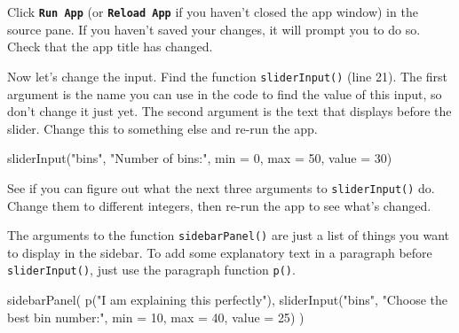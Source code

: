 \documentclass[
  oneside]{book}
\newenvironment{Shaded}{\begin{snugshade}}{\end{snugshade}}
\newcommand{\AttributeTok}[1]{\textcolor[rgb]{0.77,0.63,0.00}{#1}}
\newcommand{\DecValTok}[1]{\textcolor[rgb]{0.00,0.00,0.81}{#1}}
\newcommand{\FunctionTok}[1]{\textcolor[rgb]{0.00,0.00,0.00}{#1}}
\newcommand{\NormalTok}[1]{#1}
\newcommand{\StringTok}[1]{\textcolor[rgb]{0.31,0.60,0.02}{#1}}
\begin{document}
Click \textbf{\texttt{Run\ App}} (or \textbf{\texttt{Reload\ App}} if you haven't closed the app window) in the source pane. If you haven't saved your changes, it will prompt you to do so. Check that the app title has changed.

Now let's change the input. Find the function \texttt{sliderInput}\texttt{()} (line 21). The first argument is the name you can use in the code to find the value of this input, so don't change it just yet. The second argument is the text that displays before the slider. Change this to something else and re-run the app.

\begin{Shaded}
\begin{Highlighting}[]
\FunctionTok{sliderInput}\NormalTok{(}\StringTok{"bins"}\NormalTok{,}
            \StringTok{"Number of bins:"}\NormalTok{,}
            \AttributeTok{min =} \DecValTok{0}\NormalTok{,}
            \AttributeTok{max =} \DecValTok{50}\NormalTok{,}
            \AttributeTok{value =} \DecValTok{30}\NormalTok{)}
\end{Highlighting}
\end{Shaded}

\begin{try}
See if you can figure out what the next three arguments to \texttt{sliderInput}\texttt{()} do. Change them to different integers, then re-run the app to see what's changed.

\end{try}

The arguments to the function \texttt{sidebarPanel}\texttt{()} are just a list of things you want to display in the sidebar. To add some explanatory text in a paragraph before \texttt{sliderInput}\texttt{()}, just use the paragraph function \texttt{p}\texttt{()}.

\begin{Shaded}
\begin{Highlighting}[]
\FunctionTok{sidebarPanel}\NormalTok{(}
   \FunctionTok{p}\NormalTok{(}\StringTok{"I am explaining this perfectly"}\NormalTok{),}
   \FunctionTok{sliderInput}\NormalTok{(}\StringTok{"bins"}\NormalTok{,}
               \StringTok{"Choose the best bin number:"}\NormalTok{,}
               \AttributeTok{min =} \DecValTok{10}\NormalTok{,}
               \AttributeTok{max =} \DecValTok{40}\NormalTok{,}
               \AttributeTok{value =} \DecValTok{25}\NormalTok{)}
\NormalTok{)}
\end{Highlighting}
\end{Shaded}
\end{document}
